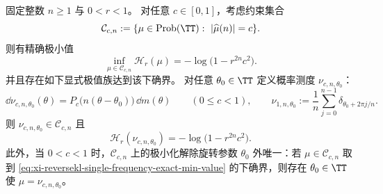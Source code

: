 \begin{theorem}\label{thm:xi-reversekl-single-frequency-exact-minimizer}
固定整数 \(n\ge 1\) 与 \(0<r<1\)。
对任意 \(c\in[0,1]\)，考虑约束集合
\[
\mathcal C_{c,n}:=\{\mu\in\mathrm{Prob}(\TT):\ |\widehat\mu(n)|=c\}.
\]
则有精确极小值
\begin{equation}\label{eq:xi-reversekl-single-frequency-exact-min-value}
\boxed{\;
\inf_{\mu\in\mathcal C_{c,n}}\mathcal H_r(\mu)=-\log\bigl(1-r^{2n}c^2\bigr).\;}
\end{equation}
并且存在如下显式极值族达到该下确界。
对任意 \(\theta_0\in\TT\) 定义概率测度 \(\nu_{c,n,\theta_0}\)：
\[
\dd\nu_{c,n,\theta_0}(\theta)=P_c\!\bigl(n(\theta-\theta_0)\bigr)\,\dd m(\theta)\qquad(0\le c<1),
\qquad
\nu_{1,n,\theta_0}:=\frac1n\sum_{j=0}^{n-1}\delta_{\theta_0+2\pi j/n}.
\]
则 \(\nu_{c,n,\theta_0}\in\mathcal C_{c,n}\) 且
\begin{equation}\label{eq:xi-reversekl-single-frequency-exact-min-attained}
\mathcal H_r(\nu_{c,n,\theta_0})=-\log\bigl(1-r^{2n}c^2\bigr).
\end{equation}
此外，当 \(0<c<1\) 时，\(\mathcal C_{c,n}\) 上的极小化解除旋转参数 \(\theta_0\) 外唯一：若 \(\mu\in\mathcal C_{c,n}\) 取到 \eqref{eq:xi-reversekl-single-frequency-exact-min-value} 的下确界，则存在 \(\theta_0\in\TT\) 使 \(\mu=\nu_{c,n,\theta_0}\)。
\end{theorem}

